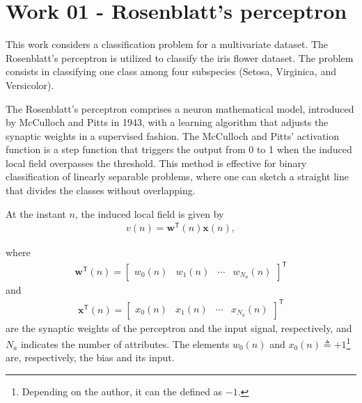 \documentclass[12pt,a4paper]{article}
\newcommand{\trans}{\mathsf{T}}
\begin{document}

\section{Work 01 - Rosenblatt's perceptron}

This work considers a classification problem for a multivariate dataset. The Rosenblatt's perceptron is utilized to classify the iris flower dataset. The problem consists in classifying one class among four subspecies (Setosa, Virginica, and Versicolor).

The Rosenblatt's perceptron comprises a neuron mathematical model, introduced by McCulloch and Pitts in 1943, with a learning algorithm that adjusts the synaptic weights in a supervised fashion. The McCulloch and Pitts' activation function is a step function that triggers the output from 0 to 1 when the induced local field overpasses the threshold. This method is effective for binary classification of linearly separable problems, where one can sketch a straight line that divides the classes without overlapping.

At the instant \(n\), the induced local field is given by
\begin{align}
    v(n) = \mathbf{w}^\trans\left(n\right) \mathbf{x}\left(n\right),
    \label{eq:induced-local-field}
\end{align}

where
\begin{align}
    \mathbf{w}^\trans\left(n\right) = \begin{bmatrix}
        w_0(n) & w_1(n) & \cdots & w_{N_a}(n)
    \end{bmatrix}^\trans
\end{align}
and
\begin{align}
    \mathbf{x}^\trans\left(n\right) = \begin{bmatrix}
        x_0(n) & x_1(n) & \cdots & x_{N_a}(n)
    \end{bmatrix}^\trans
\end{align}
are the synaptic weights of the perceptron and the input signal, respectively, and \(N_a\) indicates the number of attributes. The elements \(w_0(n)\) and \(x_0(n) \triangleq +1\)\footnote{Depending on the author, it can the defined as \(-1\).} are, respectively, the bias and its input.
\end{document}

